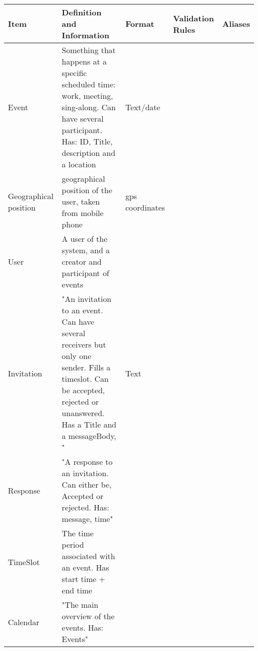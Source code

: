 \documentclass[10pt]{article}
\begin{document}
\begin{table}[ht]
\begin{tabular}{ | l | p{5cm} | l | | l | | l |}
\hline

Item & Definition and Information & Format & Validation Rules & Aliases \\
\hline

Event & Something that happens at a specific scheduled time: work, meeting, sing-along. Can have several participant. Has: ID, Title, description and a location & Text/date & & \\ \hline

Geographical position & geographical position of the user, taken from mobile phone & gps coordinates && \\ \hline

User & A user of the system, and a creator and participant of events & & & \\ \hline

Invitation & "An invitation to an event. Can have several receivers but only one sender. Fills a timeslot.
Can be accepted, rejected or unanswered.
Has a Title and a messageBody, " & Text & & \\ \hline

Response & "A response to an invitation. Can either be, Accepted or rejected.
Has: message, time" & & & \\ \hline

TimeSlot & The time period associated with an event. Has start time + end time & & & \\ \hline

Calendar & "The main overview of the events. 
Has: Events" & & & \\ \hline


\hline

\end{tabular}
\end{table}
\end{document}
